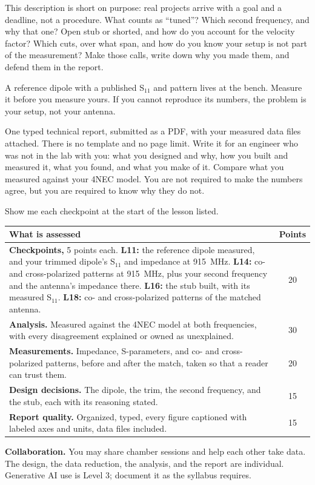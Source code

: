 \documentclass{exam}
\def\fOne{915}
\def\cpOne{11}
\def\cpTwo{14}
\def\cpThree{16}
\def\cpFour{18}
\newcommand{\head}[1]{\par\vspace{6pt}{\large\bfseries #1}\par\vspace{-2pt}}
\begin{document}
\head{What Is Up to You}

This description is short on purpose: real projects arrive with a goal and a
deadline, not a procedure. What counts as ``tuned''? Which second frequency, and why that
one? Open stub or shorted, and how do you account for the velocity factor? Which
cuts, over what span, and how do you know your setup is not part of the
measurement? Make those calls, write down why you made them, and defend them in
the report.

A reference dipole with a published S$_{11}$ and pattern lives at the bench.
Measure it before you measure yours. If you cannot reproduce its numbers, the
problem is your setup, not your antenna.

\head{The Report}

One typed technical report, submitted as a PDF, with your measured data files
attached. There is no template and no page limit. Write it for an engineer who
was not in the lab with you: what you designed and why, how you built and
measured it, what you found, and what you make of it. Compare what you measured
against your 4NEC model. You are not required to make the numbers agree, but
you are required to know why they do not.

\head{Grading}

Show me each checkpoint at the start of the lesson listed.

\begin{center}
\begin{tabular}{|p{5.3in}|c|}
\hline
\textbf{What is assessed} & \textbf{Points} \\
\hline
\textbf{Checkpoints,} 5 points each. \textbf{L\cpOne:} the reference dipole
measured, and your trimmed dipole's S$_{11}$ and impedance at \fOne\ MHz.
\textbf{L\cpTwo:} co- and cross-polarized patterns at \fOne\ MHz, plus your
second frequency and the antenna's impedance there. \textbf{L\cpThree:} the
stub built, with its measured S$_{11}$. \textbf{L\cpFour:} co- and
cross-polarized patterns of the matched antenna. & 20 \\
\hline
\textbf{Analysis.} Measured against the 4NEC model at both frequencies, with every
disagreement explained or owned as unexplained. & 30 \\
\hline
\textbf{Measurements.} Impedance, S-parameters, and co- and cross-polarized
patterns, before and after the match, taken so that a reader can trust them. & 20 \\
\hline
\textbf{Design decisions.} The dipole, the trim, the second frequency, and the
stub, each with its reasoning stated. & 15 \\
\hline
\textbf{Report quality.} Organized, typed, every figure captioned with labeled
axes and units, data files included. & 15 \\
\hline
\end{tabular}
\end{center}

\textbf{Collaboration.} You may share chamber sessions and help each other take
data. The design, the data reduction, the analysis, and the report are
individual. Generative AI use is Level 3; document it as the syllabus requires.
\end{document}
